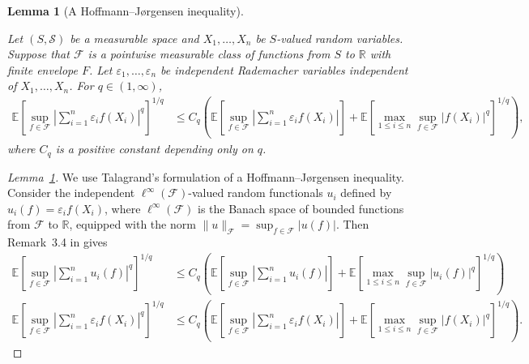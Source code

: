\documentclass[11pt,lof]{puthesis}
\newcommand{\R}{\ensuremath{\mathbb{R}}}
\newcommand{\E}{\ensuremath{\mathbb{E}}}
\newcommand{\cF}{\ensuremath{\mathcal{F}}}
\newcommand{\cS}{\ensuremath{\mathcal{S}}}
\theoremstyle{break}
\newtheorem{lemma}{Lemma}[section]
\theoremstyle{proof}
\newtheorem{proof}{Proof}
\begin{document}
\begin{lemma}[A Hoffmann--J{\o}rgensen inequality]
\label{lem:kernel_app_hoffmann}

Let $(S, \cS)$ be a measurable space
and $X_1, \ldots, X_n$
be $S$-valued random variables.
Suppose that
$\cF$ is a pointwise measurable class of functions from $S$ to $\R$
with finite envelope $F$.
Let $\varepsilon_1, \ldots, \varepsilon_n$
be independent Rademacher variables
independent of $X_1, \ldots, X_n$.
For $q \in (1, \infty)$,
%
\begin{align*}
\E \left[
\sup_{f \in \cF}
\left|
\sum_{i=1}^n
\varepsilon_i
f(X_i)
\right|
^q
\right]
^{1/q}
&\leq
C_q
\left(
\E \left[
\sup_{f \in \cF}
\left|
\sum_{i=1}^n
\varepsilon_i
f(X_i)
\right|
\right]
+
\E \left[
\max_{1 \leq i \leq n}
\sup_{f \in \cF}
\big| f(X_i) \big|^q
\right]^{1/q}
\right),
\end{align*}
%
where $C_q$ is a positive constant depending only on $q$.

\end{lemma}

\begin{proof}[Lemma~\ref{lem:kernel_app_hoffmann}]

We use Talagrand's formulation of
a Hoffmann--J{\o}rgensen inequality.
Consider the
independent
$\ell^\infty(\cF)$-valued
random functionals $u_i$ defined by
$u_i(f) = \varepsilon_i f(X_i)$,
where $\ell^\infty(\cF)$
is the Banach space of bounded functions from
$\cF$ to $\R$,
equipped with the norm
$\|u\|_\cF = \sup_{f \in \cF} |u(f)|$.
Then Remark~3.4 in \citet{kwapien1991hypercontraction} gives
%
\begin{align*}
\E \left[
\sup_{f \in \cF}
\left|
\sum_{i=1}^n
u_i(f)
\right|
^q
\right]
^{1/q}
&\leq
C_q
\left(
\E \left[
\sup_{f \in \cF}
\left|
\sum_{i=1}^n
u_i(f)
\right|
\right]
+
\E \left[
\max_{1 \leq i \leq n}
\sup_{f \in \cF}
\left|
u_i(f)
\right|^q
\right]^{1/q}
\right) \\
\E \left[
\sup_{f \in \cF}
\left|
\sum_{i=1}^n
\varepsilon_i
f(X_i)
\right|
^q
\right]
^{1/q}
&\leq
C_q
\left(
\E \left[
\sup_{f \in \cF}
\left|
\sum_{i=1}^n
\varepsilon_i
f(X_i)
\right|
\right]
+
\E \left[
\max_{1 \leq i \leq n}
\sup_{f \in \cF}
\big| f(X_i) \big|^q
\right]^{1/q}
\right).
\end{align*}
\end{proof}
\end{document}
